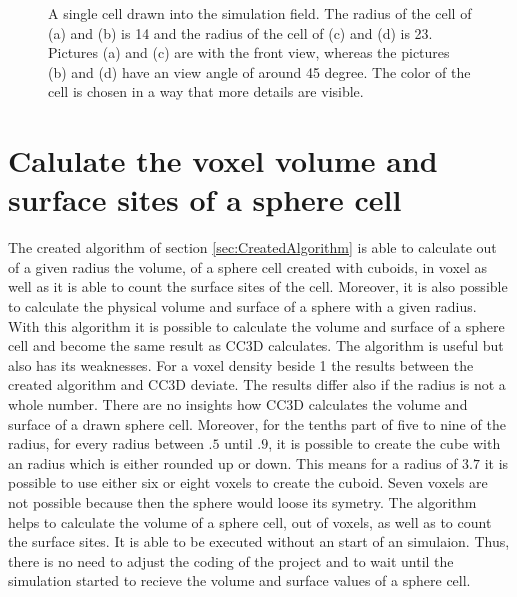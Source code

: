 \begin{figure}[ht]
\begin{center}
{	}
	\end{center}
	\caption[Drawn sphere cells with a radius of 14 and 23]{\label{img:DrawnSphereCellRadius14And23}A single cell drawn into the simulation field. The radius of the cell of (a) and (b) is 14 and the radius of the cell of (c) and (d) is 23. Pictures (a) and (c) are with the front view, whereas the
pictures (b) and (d) have an view angle of around 45 degree. The color of the cell is chosen in
a way that more details are visible.}
\end{figure}


\section{Calulate the voxel volume and surface sites of a sphere cell}
The created algorithm of section \ref{sec:CreatedAlgorithm} is able to calculate out of a given radius the volume, of a sphere cell created with cuboids, in voxel as well as it is able to count the surface sites of the cell. Moreover, it is also possible to calculate the physical volume and surface of a sphere with a given radius. With this algorithm it is possible to calculate the volume and surface of a sphere cell and become the same result as \ac{CC3D} calculates. \newline
The algorithm is useful but also has its weaknesses. For a voxel density beside 1 the results between the created algorithm and \ac{CC3D} deviate. The results differ also if the radius is not a whole number. There are no insights how \ac{CC3D} calculates the volume and surface of a drawn sphere cell. Moreover, for the tenths part of five to nine of the radius, for every radius between $.5$ until $.9$, it is possible to create the cube with an radius which is either rounded up or down. This means for a radius of $3.7$ it is possible to use either six or eight voxels to create the cuboid. Seven voxels are not possible because then the sphere would loose its symetry. \newline
The algorithm helps to calculate the volume of a sphere cell, out of voxels, as well as to count the surface sites. It is able to be executed without an start of an simulaion. Thus, there is no need to adjust the coding of the project and to wait until the simulation started to recieve the volume and surface values of a sphere cell. 

